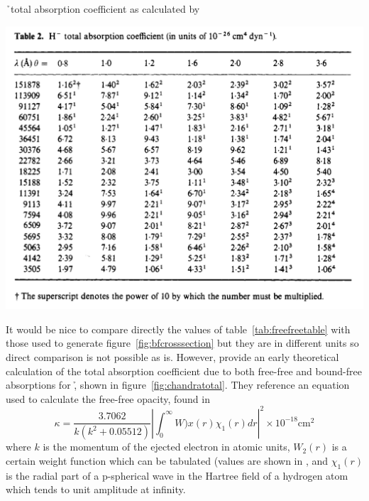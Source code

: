\begin{table}
\caption{\label{tab:boundfreecomp}\h\ total absorption coefficient as calculated by \cite{bell1975}}
\includegraphics[width=\linewidth]{figs/freeandboundtable.png}
\end{table}

It would be nice to compare directly the values of
table~\ref{tab:freefreetable} with those used to generate
figure~\ref{fig:bfcrosssection} but they are in different units so
direct comparison is not possible as is.  However, \cite{chandra1946}
provide an early theoretical calculation of the total absorption
coefficient due to both free-free and bound-free absorptions for \h,
shown in figure~\ref{fig:chandratotal}.  They reference an equation
used to calculate the free-free opacity, found in \cite{chandra1945}
\begin{equation}
\kappa = \frac{3.7062}{k(k^2+0.05512)}\left\lvert \int_0^{\infty}W)x(r)\chi_1(r)dr \right\rvert^2 \times 10^{-18} \textrm{cm}^2
\end{equation}
where $k$ is the momentum of the ejected electron in atomic units, $W_2(r)$ is a certain weight function which can be tabulated (values are shown in \citealt{chandra1945}, and $\chi_1(r)$ is the radial part of a p-spherical wave in the Hartree field of a hydrogen atom which tends to unit amplitude at infinity.

